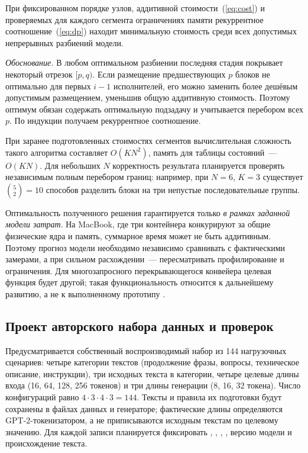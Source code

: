 \begin{proposition}
При фиксированном порядке узлов, аддитивной стоимости~(\ref{eq:cost}) и проверяемых для каждого сегмента ограничениях памяти рекуррентное соотношение~(\ref{eq:dp}) находит минимальную стоимость среди всех допустимых непрерывных разбиений модели.
\end{proposition}
\noindent\emph{Обоснование.} В любом оптимальном разбиении последняя стадия покрывает некоторый отрезок $[p,q)$. Если размещение предшествующих $p$ блоков не оптимально для первых $i-1$ исполнителей, его можно заменить более дешёвым допустимым размещением, уменьшив общую аддитивную стоимость. Поэтому оптимум обязан содержать оптимальную подзадачу и учитывается перебором всех $p$. По индукции получаем рекуррентное соотношение.

При заранее подготовленных стоимостях сегментов вычислительная сложность такого алгоритма составляет $O(KN^2)$, память для таблицы состояний~--- $O(KN)$. Для небольших $N$ корректность результата планируется проверять независимым полным перебором границ: например, при $N=6$, $K=3$ существует $\binom{5}{2}=10$ способов разделить блоки на три непустые последовательные группы.

Оптимальность полученного решения гарантируется только \emph{в рамках заданной модели затрат}. На MacBook, где три контейнера конкурируют за общие физические ядра и память, суммарное время может не быть аддитивным. Поэтому прогноз модели необходимо независимо сравнивать с фактическими замерами, а при сильном расхождении~--- пересматривать профилирование и ограничения. Для многозапросного перекрывающегося конвейера целевая функция будет другой; такая функциональность относится к дальнейшему развитию, а не к выполненному прототипу \cite{hwang2026}.

\subsection{Проект авторского набора данных и проверок}

Предусматривается собственный воспроизводимый набор из 144 нагрузочных сценариев: четыре категории текстов (продолжение фразы, вопросы, техническое описание, инструкции), три исходных текста в категории, четыре целевые длины входа (16, 64, 128, 256 токенов) и три длины генерации (8, 16, 32 токена). Число конфигураций равно $4\cdot3\cdot4\cdot3=144$. Тексты и правила их подготовки будут сохранены в файлах данных и генераторе; фактические длины определяются GPT-2-токенизатором, а не приписываются исходным текстам по целевому значению. Для каждой записи планируется фиксировать , , , , версию модели и происхождение текста.

